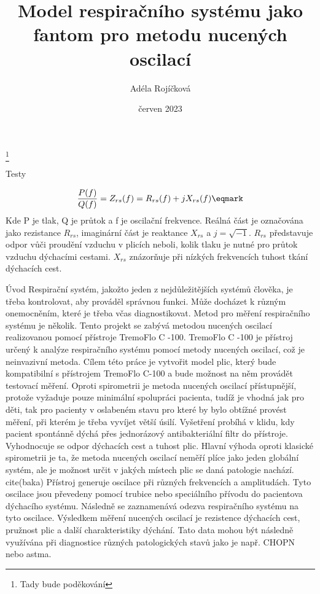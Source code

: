 


\worktype [O/CZ]
\title {Model respiračního systému jako fantom pro metodu nucených oscilací }
\author {Adéla Rojíčková}
\date {červen 2023}

\thanks{Tady bude poděkování}


\makefront

\chap Testy

$$
  {P(f) \over Q(f)} = Z_{rs}(f) = R_{rs}(f) + j X_{rs}(f) \eqmark
$$
Kde P je tlak, Q je průtok a f je oscilační frekvence. 
Reálná část je označována jako rezistance $R_{rs}$, imaginární část je reaktance $X_{rs}$ a $j = \sqrt{-1}$. 
$R_{rs}$ představuje odpor vůči proudění vzduchu v plicích neboli, kolik tlaku je nutné pro průtok vzduchu dýchacími cestami. $X_{rs}$ znázorňuje při nízkých frekvencích tuhost tkání dýchacích cest. 



\chap Úvod
Respirační systém, jakožto jeden z nejdůležitějších systémů člověka, je třeba kontrolovat, aby prováděl správnou funkci. Může docházet k různým onemocněním, které je třeba včas diagnostikovat. Metod pro měření respiračního systému je několik. Tento projekt se zabývá metodou nucených oscilací realizovanou pomocí přístroje TremoFlo C -100. 
TremoFlo C -100 je přístroj určený k analýze respiračního systému pomocí metody nucených oscilací, což je neinvazivní metoda. Cílem této práce je vytvořit model plic, který bude kompatibilní s přístrojem TremoFlo C-100 a bude možnost na něm provádět testovací měření. Oproti spirometrii je metoda nucených oscilací přístupnější, protože vyžaduje pouze minimální spolupráci pacienta, tudíž je vhodná jak pro děti, tak pro pacienty v oslabeném stavu pro které by bylo obtížné provést měření, při kterém je třeba vyvíjet větší úsilí. Vyšetření probíhá v klidu, kdy pacient spontánně dýchá přes jednorázový antibakteriální filtr do přístroje. Vyhodnocuje se odpor dýchacích cest a tuhost plic. Hlavní výhoda oproti klasické spirometrii je ta, že metoda nucených oscilací neměří plíce jako jeden globální systém, ale je možnost určit v jakých místech plic se daná patologie nachází. cite(baka) 
Přístroj generuje oscilace při různých frekvencích a amplitudách. Tyto oscilace jsou převedeny pomocí trubice nebo speciálního přívodu do pacientova dýchacího systému. Následně se zaznamenává odezva respiračního systému na tyto oscilace. Výsledkem měření nucených oscilací je rezistence dýchacích cest, pružnost plic a další charakteristiky dýchání. Tato data mohou být následně využívána při diagnostice různých patologických stavů jako je např. CHOPN nebo astma. 

